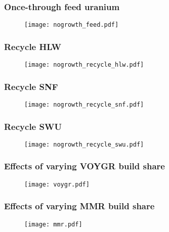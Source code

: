 \begin{frame}
    \frametitle{Once-through feed uranium}
    \begin{figure}
        \centering 
        \texttt{[image: nogrowth\_feed.pdf]}
    \end{figure}
\end{frame}

\begin{frame}
    \frametitle{Recycle HLW}
    \begin{figure}
        \centering
        \texttt{[image: nogrowth\_recycle\_hlw.pdf]}
    \end{figure}
\end{frame}

\begin{frame}
    \frametitle{Recycle SNF}
    \begin{figure}
        \centering
        \texttt{[image: nogrowth\_recycle\_snf.pdf]}
    \end{figure}
\end{frame}

\begin{frame}
    \frametitle{Recycle SWU}
    \begin{figure}
        \centering
        \texttt{[image: nogrowth\_recycle\_swu.pdf]}
    \end{figure}
\end{frame}

\begin{frame}
    \frametitle{Effects of varying VOYGR build share}
    \begin{figure}
        \centering
        \texttt{[image: voygr.pdf]}
    \end{figure}
\end{frame}

\begin{frame}
    \frametitle{Effects of varying MMR build share}
    \begin{figure}
        \centering
        \texttt{[image: mmr.pdf]}
    \end{figure}
\end{frame}

